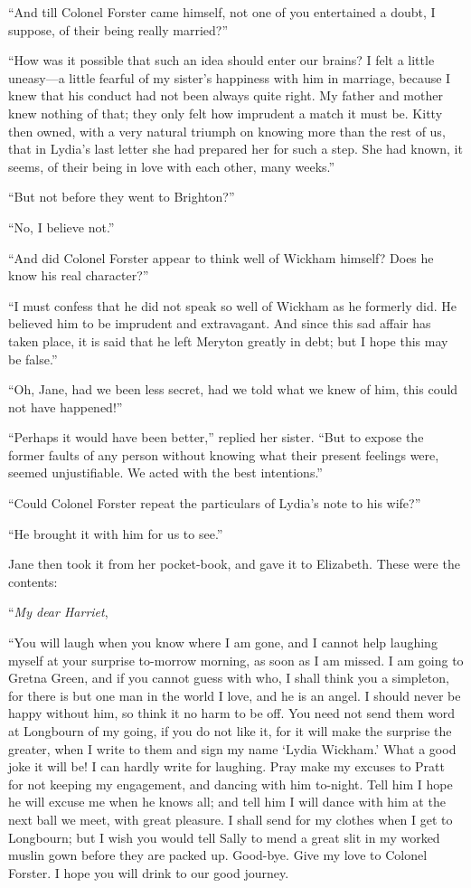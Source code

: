 ``And till Colonel Forster came himself, not one of you
entertained a doubt, I suppose, of their being really married?''

``How was it possible that such an idea should enter our brains?
I felt a little uneasy---a little fearful of my sister's happiness
with him in marriage, because I knew that his conduct had not been
always quite right.  My father and mother knew nothing of that;
they only felt how imprudent a match it must be.  Kitty then
owned, with a very natural triumph on knowing more than the
rest of us, that in Lydia's last letter she had prepared her for
such a step.  She had known, it seems, of their being in love with
each other, many weeks.''

``But not before they went to Brighton?''

``No, I believe not.''

``And did Colonel Forster appear to think well of Wickham
himself?  Does he know his real character?''

``I must confess that he did not speak so well of Wickham as he
formerly did.  He believed him to be imprudent and extravagant.
And since this sad affair has taken place, it is said that he
left Meryton greatly in debt; but I hope this may be false.''

``Oh, Jane, had we been less secret, had we told what we knew
of him, this could not have happened!''

``Perhaps it would have been better,'' replied her sister.  ``But to
expose the former faults of any person without knowing what
their present feelings were, seemed unjustifiable.  We acted with
the best intentions.''

``Could Colonel Forster repeat the particulars of Lydia's note to
his wife?''

``He brought it with him for us to see.''

Jane then took it from her pocket-book, and gave it to Elizabeth.
These were the contents:

\bigskip
``\emph{My dear Harriet},
\medskip

``You will laugh when you know where I am gone, and I cannot
help laughing myself at your surprise to-morrow morning, as
soon as I am missed.  I am going to Gretna Green, and if you
cannot guess with who, I shall think you a simpleton, for there
is but one man in the world I love, and he is an angel.  I should
never be happy without him, so think it no harm to be off.  You
need not send them word at Longbourn of my going, if you do
not like it, for it will make the surprise the greater, when I
write to them and sign my name `Lydia Wickham.'  What a good
joke it will be!  I can hardly write for laughing.  Pray make
my excuses to Pratt for not keeping my engagement, and dancing
with him to-night.  Tell him I hope he will excuse me when he
knows all; and tell him I will dance with him at the next ball
we meet, with great pleasure.  I shall send for my clothes when
I get to Longbourn; but I wish you would tell Sally to mend a
great slit in my worked muslin gown before they are packed up.
Good-bye.  Give my love to Colonel Forster.  I hope you will
drink to our good journey.

